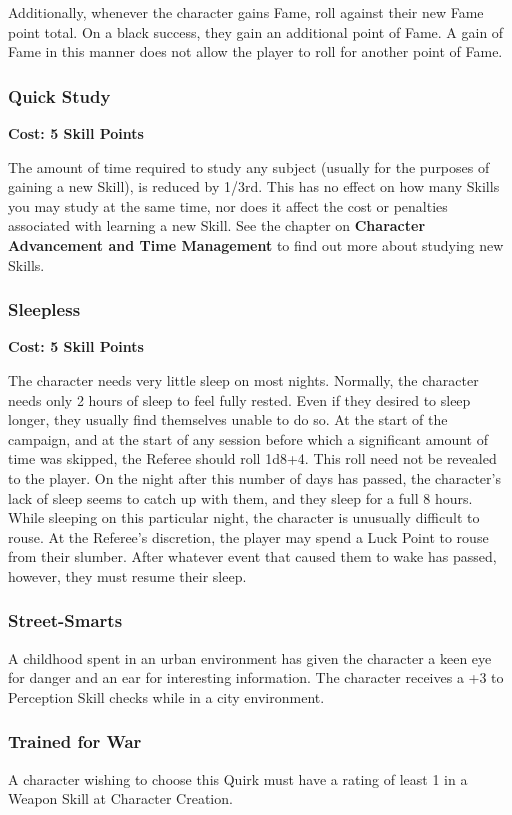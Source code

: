 \documentclass[oneside]{book}
\begin{document}
\begin{multicols}{2}
Additionally, whenever the character gains Fame, roll against their new Fame point total. On a black success, they gain an additional point of Fame. A gain of Fame in this manner does not allow the player to roll for another point of Fame.

\subsubsection{Quick Study}
\textbf{\small Cost: 5 Skill Points}

The amount of time required to study any subject (usually for the purposes of gaining a new Skill), is reduced by 1/3rd. This has no effect on how many Skills you may study at the same time, nor does it affect the cost or penalties associated with learning a new Skill. See the chapter on \textbf{Character Advancement and Time Management} to find out more about studying new Skills.

\subsubsection{Sleepless}
\textbf{\small Cost: 5 Skill Points}

The character needs very little sleep on most nights. Normally, the character needs only 2 hours of sleep to feel fully rested. Even if they desired to sleep longer, they usually find themselves unable to do so. At the start of the campaign, and at the start of any session before which a significant amount of time was skipped, the Referee should roll 1d8+4. This roll need not be revealed to the player. On the night after this number of days has passed, the character's lack of sleep seems to catch up with them, and they sleep for a full 8 hours. While sleeping on this particular night, the character is unusually difficult to rouse. At the Referee's discretion, the player may spend a Luck Point to rouse from their slumber. After whatever event that caused them to wake has passed, however, they must resume their sleep.

\subsubsection{Street-Smarts}
A childhood spent in an urban environment has given the character a keen eye for danger and an ear for interesting information. The character receives a +3 to Perception Skill checks while in a city environment. 

\subsubsection{Trained for War}
A character wishing to choose this Quirk must have a rating of least 1 in a Weapon Skill at Character Creation.


\end{multicols}
\end{document}
